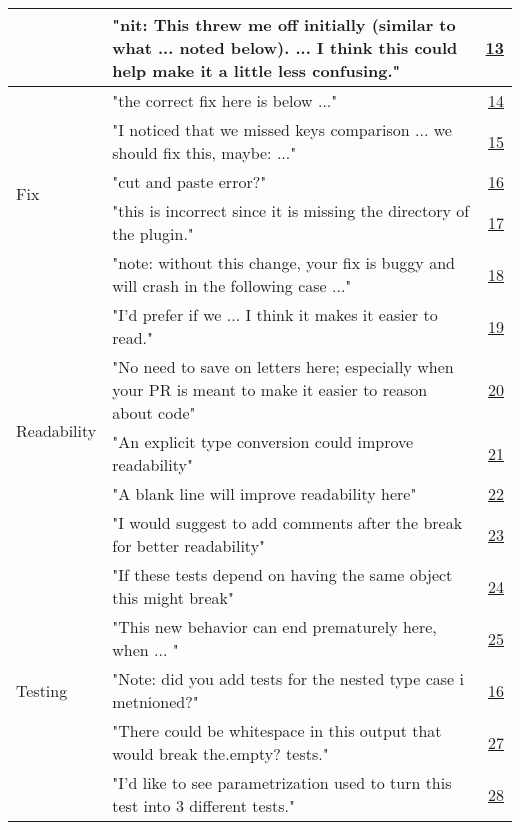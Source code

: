 \begin{table*}
\begin{tabular}{llr}
 &"nit: This threw me off initially (similar to what ... noted below). ... I think this could help make it a little less confusing."&\href{https://github.com/bitcoin/bitcoin/pull/19010\#discussion_r428944198}{13}\\
 \hline
\multirow{5}{*}{Fix} &"the correct fix here is below ..."&\href{https://github.com/bitcoin/bitcoin/pull/19107\#discussion_r440855270}{14}\\
 &"I noticed that we missed keys comparison ... we should fix this, maybe: ..."&\href{https://github.com/django/django/pull/13220\#discussion_r459051110}{15}\\
 &"cut and paste error?"&\href{https://github.com/osquery/osquery/pull/6038\#discussion_r345556858}{16}\\
 &"this is incorrect since it is missing the directory of the plugin."&\href{https://github.com/apache/flink/pull/12131\#discussion_r424978393}{17}\\
 &"note: without this change, your fix is buggy and will crash in the following case ..."&\href{https://github.com/dotnet/roslyn/pull/47369\#discussion_r483879680}{18}\\
 \hline
\multirow{5}{*}{Readability} &"I'd prefer if we ... I think it makes it easier to read."&\href{https://github.com/dotnet/coreclr/pull/27415\#discussion_r338726349}{19}\\
 &"No need to save on letters here; especially when your PR is meant to make it easier to reason about code"&\href{https://github.com/dolphin-emu/dolphin/pull/8334\#discussion_r317662663}{20}\\
 &"An explicit type conversion could improve readability"&\href{https://github.com/bitcoin/bitcoin/pull/18242\#discussion_r407261271}{21}\\
 &"A blank line will improve readability here"&\href{https://github.com/apache/flink/pull/13273\#discussion_r481006879}{22}\\
 &"I would suggest to add comments after the break for better readability"&\href{https://github.com/apache/flink/pull/11615\#discussion_r411075936}{23}\\
 \hline
\multirow{5}{*}{Testing} &"If these tests depend on having the same object this might break"&\href{https://github.com/chef/chef/pull/9354\#discussion_r460317975}{24}\\
 &"This new behavior can end prematurely here, when ... "&\href{https://github.com/xbmc/xbmc/pull/15591\#discussion_r259688786}{25}\\
 &"Note: did you add tests for the nested type case i metnioned?"&\href{https://github.com/dotnet/roslyn/pull/45806\#discussion_r453991324}{16}\\
 &"There could be whitespace in this output that would break the.empty? tests."&\href{https://github.com/chef/chef/pull/10064\#discussion_r445750605}{27}\\
 &"I'd like to see parametrization used to turn this test into 3 different tests."&\href{https://github.com/mapbox/rasterio/pull/1754\#discussion_r316785761}{28}\\
  \bottomrule
\end{tabular}
\end{table*}